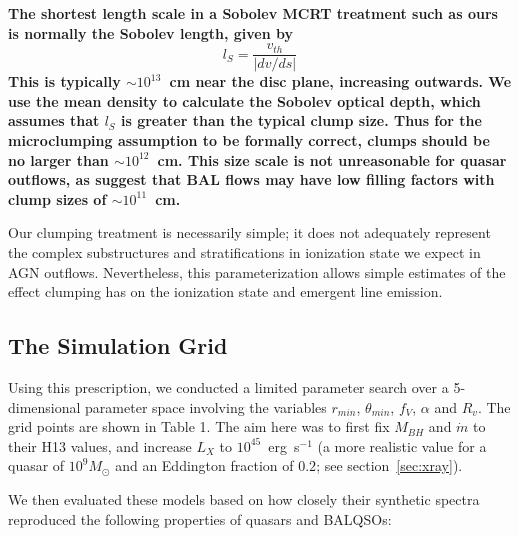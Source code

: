 \documentclass[useAMS,usenatbib]{mn2e_x}
\begin{document}
{\bf 
The shortest length scale in a Sobolev MCRT treatment such as ours 
is normally the Sobolev length, given by
\begin{equation}
l_S = \frac{v_{th}}{| dv/ds |}
\end{equation}
This is typically $\sim10^{13}$~cm near the disc plane, increasing outwards.
We use the mean density to calculate the Sobolev optical depth, which assumes that
$l_S$ is greater than the typical clump size.
Thus for the microclumping assumption to be formally correct, 
clumps should be no larger than $\sim10^{12}$~cm.
This size scale is not unreasonable for quasar outflows, as
\cite{dekool1995} suggest that BAL flows may have low filling factors with
clump sizes of $\sim10^{11}$~cm. }

Our clumping treatment is necessarily simple; it does not adequately
represent the complex substructures and stratifications in ionization
state we expect in AGN outflows. 
Nevertheless, this parameterization 
allows simple estimates of the effect clumping has on the ionization 
state and emergent line emission.

\subsection{The Simulation Grid}

Using this prescription, we conducted a limited parameter
search over a 5-dimensional parameter space involving the 
variables $r_{min}$, $\theta_{min}$, $f_V$, $\alpha$ and $R_v$.
The grid points are shown in Table 1.
The aim here was to first fix $M_{BH}$ and $\dot{m}$ to their H13 values,
and increase $L_X$ to $10^{45}$~erg~s$^{-1}$ (a more realistic value for a 
quasar of $10^9M_\odot$ and an Eddington fraction of $0.2$; see section~\ref{sec:xray}).

We then evaluated these models based on 
how closely their synthetic spectra reproduced the 
following properties of quasars and BALQSOs:
\end{document}
